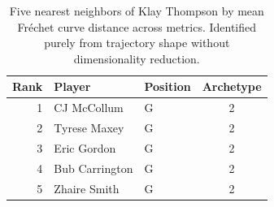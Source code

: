 \begin{table}[htbp]
  \centering\small
  \begin{tabular}{rllc}
    \toprule
    Rank & Player & Position & Archetype \\
    \midrule
    1 & CJ McCollum & G & 2 \\
    2 & Tyrese Maxey & G & 2 \\
    3 & Eric Gordon & G & 2 \\
    4 & Bub Carrington & G & 2 \\
    5 & Zhaire Smith & G & 2 \\
    \bottomrule
  \end{tabular}
  \caption{Five nearest neighbors of Klay Thompson by mean Fr\'{e}chet curve distance across metrics. Identified purely from trajectory shape without dimensionality reduction.}
  \label{tab:Klay_Thompson_frechet_curve_neighbors}
\end{table}

